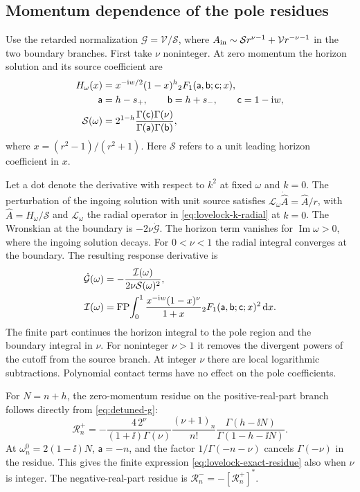 \subsection{Momentum dependence of the pole residues}
\label{sec:lovelock-residues}

Use the retarded normalization \(\mathcal G=\mathcal V/\mathcal S\),
where \(A_{\rm in}\sim\mathcal S r^{\nu-1}+\mathcal V r^{-\nu-1}\)
in the two boundary branches. First take \(\nu\) noninteger. At
zero momentum the horizon solution and its source coefficient are
\begin{align}
 H_\omega(x)&=x^{-{\mathrm{i} w}/2}(1-x)^h
       {}_2F_1(\mathsf a,\mathsf b;\mathsf c;x),\notag\\
 \mathsf a&=h-s_+,\qquad \mathsf b=h+s_-,
 \qquad \mathsf c=1-\mathrm{i} w,\notag\\
 \mathcal S(\omega)&=2^{1-h}
  \frac{\Gamma(\mathsf c)\Gamma(\nu)}
       {\Gamma(\mathsf a)\Gamma(\mathsf b)} ,
 \label{eq:lovelock-horizon-general}
\end{align}
where \(x=(r^2-1)/(r^2+1)\). Here \(\mathcal S\) refers to a
unit leading horizon coefficient in \(x\).

Let a dot denote the derivative with respect to \(k^2\) at
fixed \(\omega\) and \(k=0\). The perturbation of the ingoing
solution with unit source satisfies
\(\mathcal L_\omega\dot{\widehat A}=\widehat A/r\), with
\(\widehat A=H_\omega/\mathcal S\) and \(\mathcal L_\omega\)
the radial operator in \eqref{eq:lovelock-k-radial} at \(k=0\).
The Wronskian at the boundary is \(-2\nu\dot{\mathcal G}\).
The horizon term vanishes for \(\operatorname{Im}\omega>0\),
where the ingoing solution decays. For \(0<\nu<1\) the
radial integral converges at the boundary. The resulting response
derivative is
\begin{align}
 \dot{\mathcal G}(\omega)
 &=-\frac{\mathcal I(\omega)}{2\nu\mathcal S(\omega)^2},\notag\\
 \mathcal I(\omega)&=
 \operatorname{FP}\!\int_0^1
 \frac{x^{-\mathrm{i} w}(1-x)^\nu}{1+x}
 {}_2F_1(\mathsf a,\mathsf b;\mathsf c;x)^2\,\mathrm{d} x .
 \label{eq:lovelock-response-derivative}
\end{align}
The finite part continues the horizon integral to the pole
region and the boundary integral in \(\nu\). For noninteger
\(\nu>1\) it removes the divergent powers of the cutoff
from the source branch. At integer \(\nu\) there are local
logarithmic subtractions. Polynomial contact terms have no
effect on the pole coefficients.

For \(N=n+h\), the zero-momentum residue on the positive-real-part
branch follows directly from \eqref{eq:detuned-g}:
\begin{equation}
 \mathcal R_n^+=-\frac{4\,2^\nu}{(1+\ii)\Gamma(\nu)}
 \frac{(\nu+1)_n}{n!}
 \frac{\Gamma(h-\ii N)}{\Gamma(1-h-\ii N)} .
 \label{eq:lovelock-exact-residue}
\end{equation}
At \(\omega_n^0=2(1-\ii)N\), \(\mathsf a=-n\), and the factor
\(1/\Gamma(-n-\nu)\) cancels \(\Gamma(-\nu)\) in the
residue. This gives the finite expression
\eqref{eq:lovelock-exact-residue} also when \(\nu\) is integer.
The negative-real-part residue is
\(\mathcal R_n^-=-[\mathcal R_n^+]^*\).


